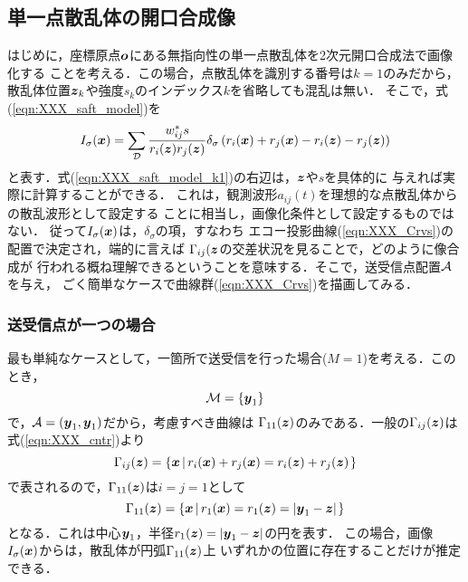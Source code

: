 \subsection{単一点散乱体の開口合成像}
はじめに，座標原点$\mbox{\boldmath $o$}$にある無指向性の単一点散乱体を2次元開口合成法で画像化する
ことを考える．この場合，点散乱体を識別する番号は$k=1$のみだから，
散乱体位置$\mbox{\boldmath $z$}_k$や強度$s_k$のインデックス$k$を省略しても混乱は無い．
そこで，式(\ref{eqn:XXX_saft_model})を
\begin{equation}
	I_\sigma(\mbox{\boldmath $x$})
		=
	\sum_{\cal D} 
	\frac{w_{ij}^*s}{r_i(\mbox{\boldmath $z$})r_j(\mbox{\boldmath $z$})} 
	\delta_\sigma\left(r_i(\mbox{\boldmath $x$})+r_j(\mbox{\boldmath $x$})-r_i(\mbox{\boldmath $z$})-r_j(\mbox{\boldmath $z$})\right) 
	\label{eqn:XXX_saft_model_k1}
\end{equation}
と表す．式(\ref{eqn:XXX_saft_model_k1})の右辺は，$\mbox{\boldmath $z$}$や$s$を具体的に
与えれば実際に計算することができる．
これは，観測波形$a_{ij}(t)$を理想的な点散乱体からの散乱波形として設定する
ことに相当し，画像化条件として設定するものではない．
従って$I_\sigma(\mbox{\boldmath $x$})$は，$\delta_{\sigma}$の項，すなわち
エコー投影曲線(\ref{eqn:XXX_Crvs})の配置で決定され，端的に言えば
$\Gamma_{ij}(\mbox{\boldmath $z$}$の交差状況を見ることで，どのように像合成が
行われる概ね理解できるということを意味する．そこで，送受信点配置$\cal A$を与え，
ごく簡単なケースで曲線群(\ref{eqn:XXX_Crvs})を描画してみる．
\subsubsection{送受信点が一つの場合}
最も単純なケースとして，一箇所で送受信を行った場合($M=1$)を考える．このとき，
\begin{equation}
	{\cal M} =\left\{ 
		\mbox{\boldmath $y$}_1
	\right\}
	\label{eqn:XXX_M1}
\end{equation}
で，${\cal A}={(\mbox{\boldmath $y$}_1,\mbox{\boldmath $y$}_1)}$だから，考慮すべき曲線は
$\Gamma_{11}(\mbox{\boldmath $z$})$のみである．一般の$\Gamma_{ij}(\mbox{\boldmath $z$})$は
式(\ref{eqn:XXX_cntr})より
\begin{equation}
	\Gamma_{ij}(\mbox{\boldmath $z$})=
	\left\{
		\mbox{\boldmath $x$}
		\left| \,
		r_i(\mbox{\boldmath $x$})+r_j(\mbox{\boldmath $x$})
		=
		r_i(\mbox{\boldmath $z$})+r_j(\mbox{\boldmath $z$})
		\right.
	\right\}
	\label{eqn:}
\end{equation}
で表されるので，$\Gamma_{11}(\mbox{\boldmath $z$})$は$i=j=1$として
\begin{equation}
	\Gamma_{11}(\mbox{\boldmath $z$})= 
	\left\{
		\mbox{\boldmath $x$} \left| \, 
		r_{1}(\mbox{\boldmath $x$})=r_{1}(\mbox{\boldmath $z$})=\left| \mbox{\boldmath $y$}_1-\mbox{\boldmath $z$} \right|
		\right.
	\right\}
	\label{eqn:XXX_Gmm11}
\end{equation}
となる．これは中心$\mbox{\boldmath $y$}_1$，半径$r_1(\mbox{\boldmath $z$})=|\mbox{\boldmath $y$}_1-\mbox{\boldmath $z$}|$の円を表す．
この場合，画像$I_\sigma(\mbox{\boldmath $x$})$からは，散乱体が円弧$\Gamma_{11}(\mbox{\boldmath $z$})$上
いずれかの位置に存在することだけが推定できる．
